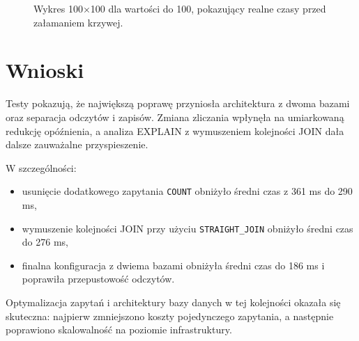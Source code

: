 ﻿\documentclass[a4paper,11pt]{article}
\begin{document}
\begin{figure}[ht]
\centering
{}
\caption{Wykres 100×100 dla wartości do 100, pokazujący realne czasy przed załamaniem krzywej.}
\end{figure}

\section{Wnioski}
Testy pokazują, że największą poprawę przyniosła architektura z dwoma bazami oraz separacja odczytów i zapisów. Zmiana zliczania wpłynęła na umiarkowaną redukcję opóźnienia, a analiza EXPLAIN z wymuszeniem kolejności JOIN dała dalsze zauważalne przyspieszenie.

W szczególności:
\begin{itemize}
  \item usunięcie dodatkowego zapytania \texttt{COUNT} obniżyło średni czas z 361 ms do 290 ms,
  \item wymuszenie kolejności JOIN przy użyciu \texttt{STRAIGHT\_JOIN} obniżyło średni czas do 276 ms,
  \item finalna konfiguracja z dwiema bazami obniżyła średni czas do 186 ms i poprawiła przepustowość odczytów.
\end{itemize}

Optymalizacja zapytań i architektury bazy danych w tej kolejności okazała się skuteczna: najpierw zmniejszono koszty pojedynczego zapytania, a następnie poprawiono skalowalność na poziomie infrastruktury.
\end{document}
